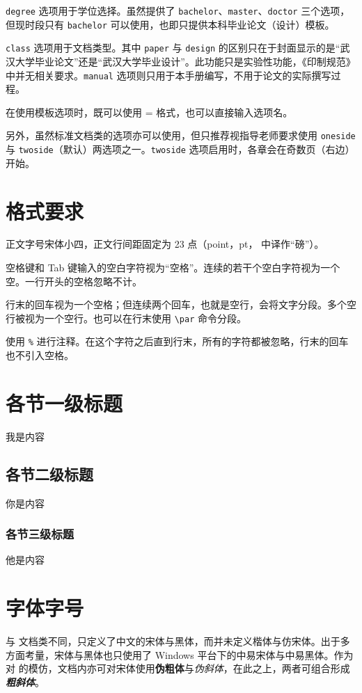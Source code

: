 \verb|degree| 选项用于学位选择。虽然提供了 \verb|bachelor|、\verb|master|、\verb|doctor| 三个选项，但现时段只有 \verb|bachelor| 可以使用，也即只提供本科毕业论文（设计）模板。

\verb|class| 选项用于文档类型。其中 \verb|paper| 与 \verb|design| 的区别只在于封面显示的是“武汉大学毕业论文”还是“武汉大学毕业设计”。此功能只是实验性功能，《印制规范》中并无相关要求。\verb|manual| 选项则只用于本手册编写，不用于论文的实际撰写过程。

在使用模板选项时，既可以使用  =  格式，也可以直接输入选项名。

另外，虽然标准文档类的选项亦可以使用，但只推荐视指导老师要求使用 \verb|oneside| 与 \verb|twoside|（默认）两选项之一。\verb|twoside| 选项启用时，各章会在奇数页（右边）开始。

\section{格式要求}
正文字号宋体小四，正文行间距固定为 23 点（point，pt， 中译作“磅”）。

空格键和 Tab       键输入的空白字符视为“空格”。连续的若干个空白字符视为一个空。一行开头的空格忽略不计。\par
行末的回车视为一个空格；但连续两个回车，也就是空行，会将文字分段。多个空行被视为一个空行。也可以在行末使用 \verb|\par| 命令分段。



使用 \verb|%| 进行注释。在这个字符之后直到行末，所有的字符都被忽略，行末的回车也不引入空格。%

\section{各节一级标题}
我是内容

\subsection{各节二级标题}
你是内容

\subsubsection{各节三级标题}
他是内容

\section{字体字号}
与 \CTeX 文档类不同，\WhuThesis 只定义了中文的宋体与{\heiti 黑体}，而并未定义楷体与仿宋体。出于多方面考量，宋体与黑体也只使用了 Windows 平台下的中易宋体与中易黑体。作为对  的模仿，文档内亦可对宋体使用\textbf{伪粗体}与\textit{伪斜体}，在此之上，两者可组合形成\textbf{\textit{粗斜体}}。

